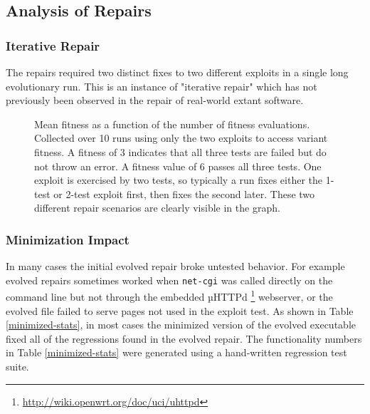 \documentclass{sigcomm-alternate}
\begin{document}
\subsection{Analysis of Repairs}
\label{sec-4-2}

\subsubsection{Iterative Repair}
\label{sec-4-2-1}
The repairs required two distinct fixes to two different exploits in a
single long evolutionary run.  This is an instance of "iterative
repair" which has not previously been observed in the repair of
real-world extant software.

\begin{figure}[htb]
  \centering
  
  \caption{Mean fitness as a function of the number of fitness
    evaluations.  Collected over 10 runs using only the two exploits
    to access variant fitness.  A fitness of 3 indicates that all
    three tests are failed but do not throw an error.  A fitness value
    of 6 passes all three tests.  One exploit is exercised by two
    tests, so typically a run fixes either the 1-test or 2-test
    exploit first, then fixes the second later.  These two different
    repair scenarios are clearly visible in the graph.}
  \label{fit-by-time}
\end{figure}

\subsubsection{Minimization Impact}
\label{sec-4-2-2}
In many cases the initial evolved repair broke untested behavior.  For
example evolved repairs sometimes worked when \texttt{net-cgi} was
called directly on the command line but not through the embedded
µHTTPd \footnote{\url{http://wiki.openwrt.org/doc/uci/uhttpd}}
webserver, or the evolved file failed to serve pages not used in the
exploit test.  As shown in Table \ref{minimized-stats}, in most cases
the minimized version of the evolved executable fixed all of the
regressions found in the evolved repair.  The functionality numbers in
Table \ref{minimized-stats} were generated using a hand-written
regression test suite.
\end{document}
